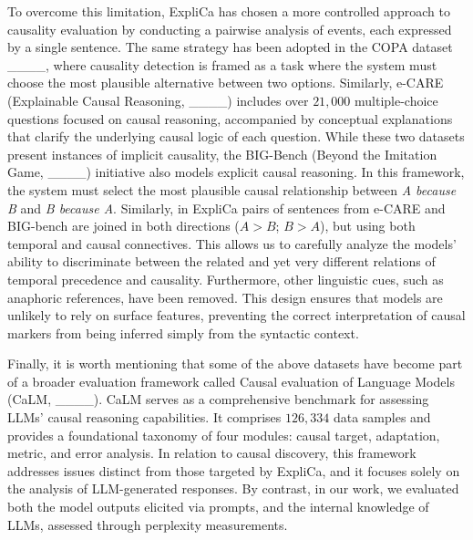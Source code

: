 To overcome this limitation, ExpliCa has chosen a more controlled approach to causality evaluation by conducting a pairwise analysis of events, each expressed by a single sentence. The same strategy has been adopted in the COPA dataset ____, where causality detection is framed as a task where the system must choose the most plausible alternative between two options. Similarly, e-CARE (Explainable Causal Reasoning, ____) includes over $21,000$ multiple-choice questions focused on causal reasoning, accompanied by conceptual explanations that clarify the underlying causal logic of each question. While these two datasets present instances of implicit causality, the BIG-Bench (Beyond the Imitation Game, ____) initiative also models explicit causal reasoning. In this framework, the system must select the most plausible causal relationship between \emph{A because B} and \emph{B because A}. Similarly, in ExpliCa pairs of sentences from e-CARE and BIG-bench are joined in both directions ($A>B$; $B>A$), but using both temporal and causal connectives. This allows us to carefully analyze the models' ability to discriminate between the related and yet very different relations of temporal precedence and causality. Furthermore, other linguistic cues, such as anaphoric references, have been removed. This design ensures that models are unlikely to rely on surface features, preventing the correct interpretation of causal markers from being inferred simply from the syntactic context.

Finally, it is worth mentioning that some of the above datasets have become part of a broader evaluation framework called Causal evaluation of Language Models (CaLM, ____). CaLM serves as a comprehensive benchmark for assessing LLMs' causal reasoning capabilities. It comprises $126,334$ data samples and provides a foundational taxonomy of four modules: causal target, adaptation, metric, and error analysis. In relation to causal discovery, this framework addresses issues distinct from those targeted by ExpliCa, and it focuses solely on the analysis of LLM-generated responses. By contrast, in our work, we evaluated both the model outputs elicited via prompts, and the internal knowledge of LLMs, assessed through perplexity measurements.
